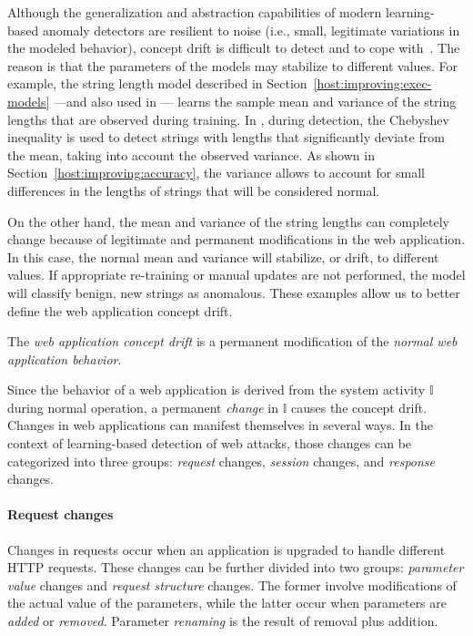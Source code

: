 Although the generalization and abstraction capabilities of modern learning\hyp{}based anomaly detectors are resilient to noise (i.e., small, legitimate variations in the modeled behavior), concept drift is difficult to detect and to cope with~\citep{concept-drift:journal}. The reason is that the parameters of the models may stabilize to different values. For example, the string length model described in Section~\ref{host:improving:exec-models} ---and also used in \webanomaly--- learns the sample mean and variance of the string lengths that are observed during training. In \webanomaly, during detection, the Chebyshev inequality is used to detect strings with lengths that significantly deviate from the mean, taking into account the observed variance. As shown in Section~\ref{host:improving:accuracy}, the variance allows to account for small differences in the lengths of strings that will be considered normal.

On the other hand, the mean and variance of the string lengths can completely change because of legitimate and permanent modifications in the web application. In this case, the normal mean and variance will stabilize, or drift, to different values. If appropriate re-training or manual updates are not performed, the model will classify benign, new strings as anomalous. These examples allow us to better define the web application concept drift.

\begin{definition}
  The \emph{web application concept drift} is a permanent modification of the \emph{normal web application behavior}.
\end{definition}

\noindent Since the behavior of a web application is derived from the system activity $\mathbb{I}$ during normal operation, a permanent \emph{change} in $\mathbb{I}$ causes the concept drift. Changes in web applications can manifest themselves in several ways. In the context of learning-based detection of web attacks, those changes can be categorized into three groups: \emph{request} changes, \emph{session} changes, and \emph{response} changes.

\paragraph{Request changes} Changes in requests occur when an application is upgraded to handle different \ac{HTTP} requests. These changes can be further divided into two groups: \emph{parameter value} changes and \emph{request structure} changes. The former involve modifications of the actual value of the parameters, while the latter occur when parameters are \emph{added} or \emph{removed}. Parameter \emph{renaming} is the result of removal plus addition.

